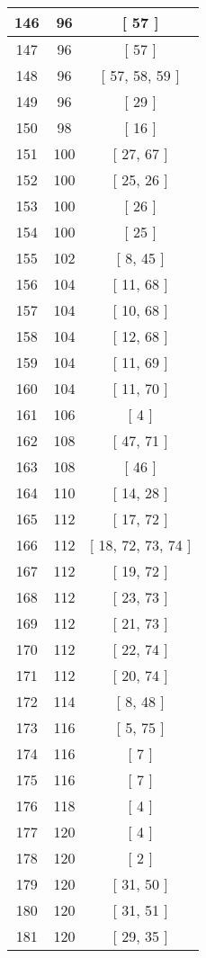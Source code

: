 \begin{center}
\begin{longtable}[H]{|| c c c ||}
\hline
146 & 96 & [ 57 ] \\ 
\hline
147 & 96 & [ 57 ] \\ 
\hline
148 & 96 & [ 57, 58, 59 ] \\ 
\hline
149 & 96 & [ 29 ] \\ 
\hline
150 & 98 & [ 16 ] \\ 
\hline
151 & 100 & [ 27, 67 ] \\ 
\hline
152 & 100 & [ 25, 26 ] \\ 
\hline
153 & 100 & [ 26 ] \\ 
\hline
154 & 100 & [ 25 ] \\ 
\hline
155 & 102 & [ 8, 45 ] \\ 
\hline
156 & 104 & [ 11, 68 ] \\ 
\hline
157 & 104 & [ 10, 68 ] \\ 
\hline
158 & 104 & [ 12, 68 ] \\ 
\hline
159 & 104 & [ 11, 69 ] \\ 
\hline
160 & 104 & [ 11, 70 ] \\ 
\hline
161 & 106 & [ 4 ] \\ 
\hline
162 & 108 & [ 47, 71 ] \\ 
\hline
163 & 108 & [ 46 ] \\ 
\hline
164 & 110 & [ 14, 28 ] \\ 
\hline
165 & 112 & [ 17, 72 ] \\ 
\hline
166 & 112 & [ 18, 72, 73, 74 ] \\ 
\hline
167 & 112 & [ 19, 72 ] \\ 
\hline
168 & 112 & [ 23, 73 ] \\ 
\hline
169 & 112 & [ 21, 73 ] \\ 
\hline
170 & 112 & [ 22, 74 ] \\ 
\hline
171 & 112 & [ 20, 74 ] \\ 
\hline
172 & 114 & [ 8, 48 ] \\ 
\hline
173 & 116 & [ 5, 75 ] \\ 
\hline
174 & 116 & [ 7 ] \\ 
\hline
175 & 116 & [ 7 ] \\ 
\hline
176 & 118 & [ 4 ] \\ 
\hline
177 & 120 & [ 4 ] \\ 
\hline
178 & 120 & [ 2 ] \\ 
\hline
179 & 120 & [ 31, 50 ] \\ 
\hline
180 & 120 & [ 31, 51 ] \\ 
\hline
181 & 120 & [ 29, 35 ] \\ 

\end{longtable}
\end{center}
